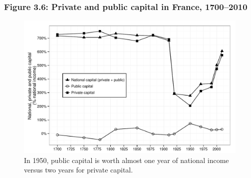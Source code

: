 \documentclass[t]{beamer}\usepackage[]{graphicx}\usepackage[]{color}
\newenvironment{knitrout}{}{} %
\begin{document}
\begin{frame}[label=Figure_3_6]
\frametitle{Figure 3.6: Private and public capital in France, 1700--2010}
\begin{figure}[t]
\begin{minipage}[b]{\textwidth}
\centering
\begin{knitrout}\footnotesize
{}\color{fgcolor}

{\centering \includegraphics[width=1\linewidth]{figures/bw/Figure_3_6} 

}



\end{knitrout}
\caption{In 1950, public capital is worth almost one year of national income versus two years for private capital.}
\end{minipage}
\end{figure}
\end{frame}
\end{document}
